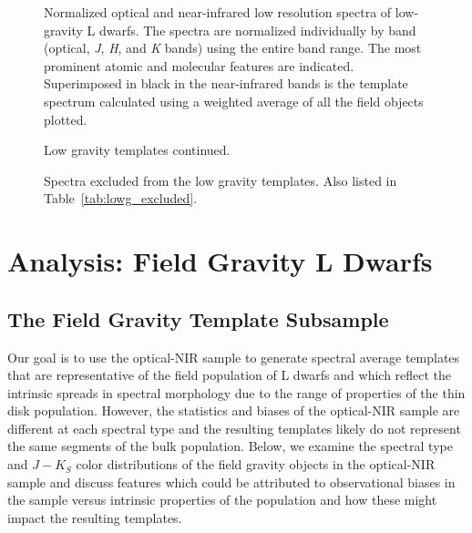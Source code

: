 \documentclass[12pt]{aastex6}
\begin{document}
\begin{figure}
  \caption{Normalized optical and near-infrared low resolution spectra of low-gravity L
dwarfs. The spectra are normalized individually by band (optical, \emph{J}, \emph{H}, and \emph{K} bands)
using the entire band range. The most prominent atomic and molecular features are indicated. Superimposed in black in the near-infrared
bands is the template spectrum calculated using a weighted average of all the
field objects plotted. }
  \label{fig:gamma_templates}
\end{figure}

\begin{figure}
  \caption{Low gravity templates continued.}
\end{figure}

\begin{figure}
  \caption{Spectra excluded from the low gravity templates. Also listed in Table~\ref{tab:lowg_excluded}.}
  \label{fig:lowg_excluded}
\end{figure}

\clearpage



\clearpage



\section{Analysis: Field Gravity L Dwarfs}
\label{sec:fieldg}

\subsection{The Field Gravity Template Subsample}
\label{sec:templates_normal}

Our goal is to use the optical-NIR sample to generate spectral average templates that are representative of the field population of L dwarfs and which reflect the intrinsic spreads in spectral morphology due to the range of properties of the thin disk population.
However, the statistics and biases of the optical-NIR sample are different at each spectral type and the resulting templates likely do not represent the same segments of the bulk population.
Below, we examine the spectral type and $J-K_S$ color distributions of the field gravity objects in the optical-NIR sample and discuss features which could be attributed to observational biases in the sample versus intrinsic properties of the population and how these might impact the resulting templates.
\end{document}
